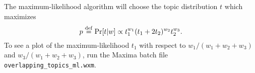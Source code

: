 \documentclass{article}
\newcommand{\DefEq}{\stackrel{\mathrm{def}}{=}}
\DeclareMathOperator{\D}{d}
\begin{document}
The maximum-likelihood algorithm will choose the topic distribution \(t\) which maximizes
\begin{equation}
    \label{Eq:OverlappingMLExpr}
    p \DefEq \Pr[ t | w ] \propto t_1^{w_1} (t_1 + 2 t_2)^{w_2} t_2^{w_3}
    \ldotp
\end{equation}
To see a plot of the maximum-likelihood \(t_1\) with respect to \(w_1 / (w_1 + w_2 + w_3)\) and \(w_3 / (w_1 + w_2 + w_3)\), run the Maxima batch file \texttt{overlapping\_topics\_ml.wxm}.

{}

\end{document}
